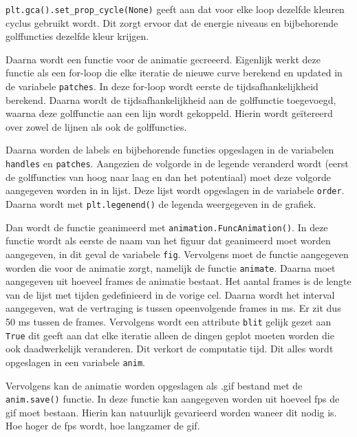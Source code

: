 \documentclass[11pt]{article}
\begin{document}
\texttt{plt.gca().set\_prop\_cycle(None)} geeft aan dat voor elke loop
dezelfde kleuren cyclus gebruikt wordt. Dit zorgt ervoor dat de energie
niveaus en bijbehorende golffuncties dezelfde kleur krijgen.

Daarna wordt een functie voor de animatie gecreeerd. Eigenlijk werkt
deze functie als een for-loop die elke iteratie de nieuwe curve berekend
en updated in de variabele \texttt{patches}. In deze for-loop wordt
eerste de tijdsafhankelijkheid berekend. Daarna wordt de
tijdsafhankelijkheid aan de golffunctie toegevoegd, waarna deze
golffunctie aan een lijn wordt gekoppeld. Hierin wordt geïtereerd over
zowel de lijnen als ook de golffuncties.

Daarna worden de labels en bijbehorende functies opgeslagen in de
variabelen \texttt{handles} en \texttt{patches}. Aangezien de volgorde
in de legende veranderd wordt (eerst de golffuncties van hoog naar laag
en dan het potentiaal) moet deze volgorde aangegeven worden in in lijst.
Deze lijst wordt opgeslagen in de variabele \texttt{order}. Daarna wordt
met \texttt{plt.legenend()} de legenda weergegeven in de grafiek.

Dan wordt de functie geanimeerd met \texttt{animation.FuncAnimation()}.
In deze functie wordt als eerste de naam van het figuur dat geanimeerd
moet worden aangegeven, in dit geval de variabele \texttt{fig}.
Vervolgens moet de functie aangegeven worden die voor de animatie zorgt,
namelijk de functie \texttt{animate}. Daarna moet aangegeven uit hoeveel
frames de animatie bestaat. Het aantal frames is de lengte van de lijst
met tijden gedefinieerd in de vorige cel. Daarna wordt het interval
aangegeven, wat de vertraging is tussen opeenvolgende frames in ms. Er
zit dus 50 ms tussen de frames. Vervolgens wordt een attribute
\texttt{blit} gelijk gezet aan \texttt{True} dit geeft aan dat elke
iteratie alleen de dingen geplot moeten worden die ook daadwerkelijk
veranderen. Dit verkort de computatie tijd. Dit alles wordt opgeslagen
in een variabele \texttt{anim}.

Vervolgens kan de animatie worden opgeslagen als .gif bestand met de
\texttt{anim.save()} functie. In deze functie kan aangegeven worden uit
hoeveel fps de gif moet bestaan. Hierin kan natuurlijk gevarieerd worden
waneer dit nodig is. Hoe hoger de fps wordt, hoe langzamer de gif.
\end{document}
